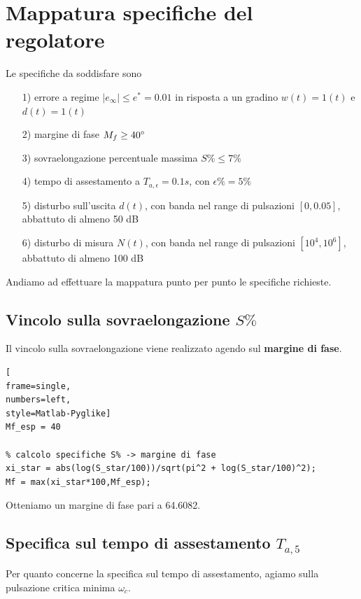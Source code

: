 \documentclass[a4paper, 11pt]{article}
\begin{document}
\section{Mappatura specifiche del regolatore}
\label{sec:specifications}

Le specifiche da soddisfare sono
\begin{itemize}
	\item[1)] errore a regime $|e_{\infty}| \le e^* = 0.01$ in risposta a un gradino $w(t) = 1(t)$ e $d(t) = 1(t)$
	\item[2)] margine di fase \textbf{$M_f \ge 40 \degree$}
	\item[3)] sovraelongazione percentuale massima $S\% \le 7\%$
        \item[4)] tempo di assestamento a $T_{a,\epsilon} = 0.1s$, con $\epsilon\% = 5\%$
        \item[5)] disturbo sull'uscita $d(t)$, con banda nel range di pulsazioni $[0,0.05]$, abbattuto di almeno 50 dB
        \item[6)] disturbo di misura $N(t)$, con banda nel range di pulsazioni $[10^4,10^6]$, abbattuto di almeno 100 dB
\end{itemize}
%
Andiamo ad effettuare la mappatura punto per punto le specifiche richieste. 

\subsection{\textbf{Vincolo sulla sovraelongazione $S\%$}} 
Il vincolo sulla sovraelongazione viene realizzato agendo sul \textbf{margine di fase}. \\

\begin{lstlisting}[
frame=single,
numbers=left,
style=Matlab-Pyglike]
Mf_esp = 40

% calcolo specifiche S% -> margine di fase
xi_star = abs(log(S_star/100))/sqrt(pi^2 + log(S_star/100)^2);
Mf = max(xi_star*100,Mf_esp);
\end{lstlisting}

Otteniamo un margine di fase pari a 64.6082. 

\subsection{\textbf{Specifica sul tempo di assestamento $T_{a,5}$}}
Per quanto concerne la specifica sul tempo di assestamento, agiamo sulla pulsazione critica minima $\omega_c$. \\ 
\end{document}
